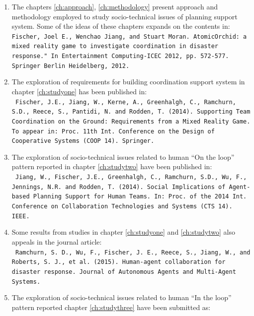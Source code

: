 \begin{enumerate}
\item The chapters \ref{ch:approach}, \ref{ch:methodology}  present approach and methodology employed to study socio-technical issues of planning support system. Some of the ideas of these chapters expands on the contents in:\\

\texttt{Fischer, Joel E., Wenchao Jiang, and Stuart Moran. AtomicOrchid: a mixed reality game to investigate coordination in disaster response." In Entertainment Computing-ICEC 2012, pp. 572-577. Springer Berlin Heidelberg, 2012.}\\

\item The exploration of requirements for building coordination support system in chapter \ref{ch:studyone}  has been published in:\\ 

\texttt{ Fischer, J.E., Jiang, W., Kerne, A., Greenhalgh, C., Ramchurn, S.D., Reece, S., Pantidi, N. and Rodden, T. (2014). Supporting Team Coordination on the Ground: Requirements from a Mixed Reality Game. To appear in: Proc. 11th Int. Conference on the Design of Cooperative Systems (COOP 14). Springer.}\\


\item The exploration of socio-technical issues related to human ``On the loop'' pattern reported in chapter \ref{ch:studytwo} have been published in:\\

\texttt{ Jiang, W., Fischer, J.E., Greenhalgh, C., Ramchurn, S.D., Wu, F., Jennings, N.R. and Rodden, T. (2014). Social Implications of Agent-based Planning Support for Human Teams.  In: Proc. of the 2014 Int. Conference on Collaboration Technologies and Systems (CTS 14). IEEE.}\\

\item Some results from studies in chapter \ref{ch:studyone} and \ref{ch:studytwo} also appeals in the journal article:\\

\texttt{ Ramchurn, S. D., Wu, F., Fischer, J. E., Reece, S., Jiang, W., and Roberts, S. J., et al. (2015). Human-agent collaboration for disaster response. Journal of Autonomous Agents and Multi-Agent Systems.}\\

\item The exploration of socio-technical issues related to human ``In the loop'' pattern reported chapter \ref{ch:studythree} have been submitted as:\\


\end{enumerate}
